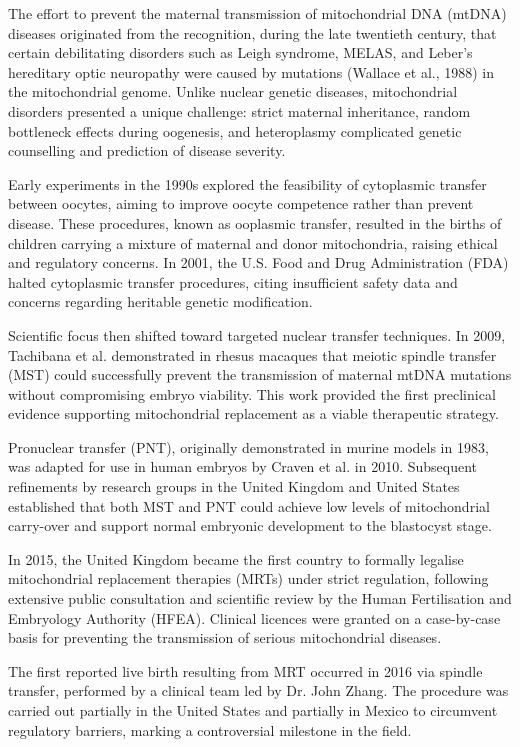 \begin{historical}

The effort to prevent the maternal transmission of mitochondrial DNA (mtDNA) diseases originated from the recognition, during the late twentieth century, that certain debilitating disorders such as Leigh syndrome, MELAS, and Leber’s hereditary optic neuropathy were caused by mutations (Wallace et al., 1988) in the mitochondrial genome. Unlike nuclear genetic diseases, mitochondrial disorders presented a unique challenge: strict maternal inheritance, random bottleneck effects during oogenesis, and heteroplasmy complicated genetic counselling and prediction of disease severity.

Early experiments in the 1990s explored the feasibility of cytoplasmic transfer between oocytes, aiming to improve oocyte competence rather than prevent disease. These procedures, known as ooplasmic transfer, resulted in the births of children carrying a mixture of maternal and donor mitochondria, raising ethical and regulatory concerns. In 2001, the U.S. Food and Drug Administration (FDA) halted cytoplasmic transfer procedures, citing insufficient safety data and concerns regarding heritable genetic modification.

Scientific focus then shifted toward targeted nuclear transfer techniques. In 2009, Tachibana et al. demonstrated in rhesus macaques that meiotic spindle transfer (MST) could successfully prevent the transmission of maternal mtDNA mutations without compromising embryo viability. This work provided the first preclinical evidence supporting mitochondrial replacement as a viable therapeutic strategy.

Pronuclear transfer (PNT), originally demonstrated in murine models in 1983, was adapted for use in human embryos by Craven et al. in 2010. Subsequent refinements by research groups in the United Kingdom and United States established that both MST and PNT could achieve low levels of mitochondrial carry-over and support normal embryonic development to the blastocyst stage.

In 2015, the United Kingdom became the first country to formally legalise mitochondrial replacement therapies (MRTs) under strict regulation, following extensive public consultation and scientific review by the Human Fertilisation and Embryology Authority (HFEA). Clinical licences were granted on a case-by-case basis for preventing the transmission of serious mitochondrial diseases.

The first reported live birth resulting from MRT occurred in 2016 via spindle transfer, performed by a clinical team led by Dr. John Zhang. The procedure was carried out partially in the United States and partially in Mexico to circumvent regulatory barriers, marking a controversial milestone in the field.


\end{historical}
